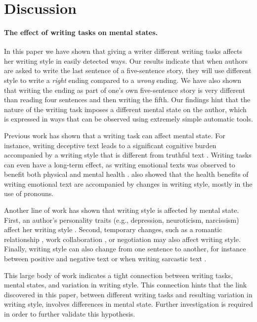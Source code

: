 \documentclass[11pt,a4paper]{article}
\newcommand{\isectionb}[1]{\section{#1}\label{ssec:#1}}
\begin{document}
\isectionb{Discussion}

\paragraph{The effect of writing tasks on mental states.}
In this paper we have shown that giving a writer different writing tasks affects her writing style in easily detected ways.
Our results indicate that when authors are asked to write the last
sentence of a five-sentence story, they will use different style to
write a {\it right} ending compared to a {\it wrong} ending. We have
also shown that writing the ending as part of one's own five-sentence story is very different than reading four sentences and then writing the fifth.
Our findings hint that the nature of the writing task imposes a
different mental state on the author, which is expressed in ways that can be observed using extremely simple automatic tools. 

Previous work has shown that a writing task can affect mental state.
For instance, writing deceptive text leads to a significant cognitive
burden accompanied by a writing style that is different from truthful
text \cite{Newman:2003,Banerjee:2014}.
Writing tasks can even have a long-term effect,
as writing emotional texts was observed to benefit both physical and mental health \cite{Lepore:2002,Frattaroli:2006}. 
\citet{Campbell:2003} also showed that the health benefits of writing emotional text are accompanied by changes in writing style, mostly in the use of pronouns.

Another line of work has shown that writing style is affected by mental state.
First, an author's personality traits (e.g., depression, neuroticism, narcissism) affect her writing style \cite{schwartz2013personality,Ireland:2014b}.
Second, temporary changes, such as a romantic relationship \cite{Ireland:2011,Bowen:2016}, work collaboration \cite{Tausczik:2009,Gonzales:2009}, or negotiation \cite{Ireland:2014} may also affect writing style.
Finally, writing style can also change from one sentence to another, for instance between positive and negative text \cite{Davidov:2010} or when writing sarcastic text \cite{Tsur:2010}. 

This large body of work indicates a tight connection between writing
tasks, mental states, and variation in writing style.
This connection hints that the link discovered in this paper, between
different writing tasks and resulting variation in writing style,
involves differences in mental state. 
Further investigation is required in order to further validate this hypothesis.
\end{document}
